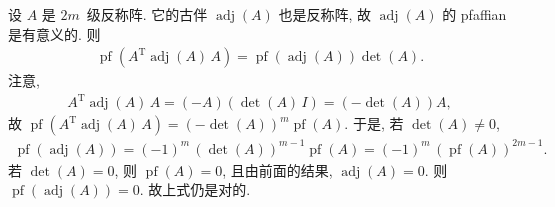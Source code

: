 \documentclass[../libro.tex]{subfiles}
\begin{document}
\begin{example}
    设 \(A\) 是 \(2m\)~级反称阵.
    它的古伴 \(\operatorname{adj} {(A)}\)
    也是反称阵,
    故 \(\operatorname{adj} {(A)}\) 的 pfaffian 是有意义的.
    则
    \begin{align*}
        \operatorname{pf} {(A^{\mathrm{T}} \operatorname{adj} {(A)}\, A)}
        = \operatorname{pf} {(\operatorname{adj} {(A)})} \det {(A)}.
    \end{align*}
    注意,
    \begin{align*}
        A^{\mathrm{T}} \operatorname{adj} {(A)}\, A
        = (-A) (\det {(A)}\, I)
        = (-\det {(A)}) A,
    \end{align*}
    故
    \(\operatorname{pf} {(A^{\mathrm{T}} \operatorname{adj} {(A)}\, A)}
    = (-\det {(A)})^m \operatorname{pf} {(A)}\).
    于是, 若 \(\det {(A)} \neq 0\),
    \begin{align*}
        \operatorname{pf} {(\operatorname{adj} {(A)})}
        = (-1)^m\, (\det {(A)})^{m-1} \operatorname{pf} {(A)}
        = (-1)^m\, (\operatorname{pf} {(A)})^{2m-1}.
    \end{align*}
    若 \(\det {(A)} = 0\),
    则 \(\operatorname{pf} {(A)} = 0\),
    且由前面的结果, \(\operatorname{adj} {(A)} = 0\).
    则
    \(\operatorname{pf} {(\operatorname{adj} {(A)})} = 0\).
    故上式仍是对的.
\end{example}
\end{document}
